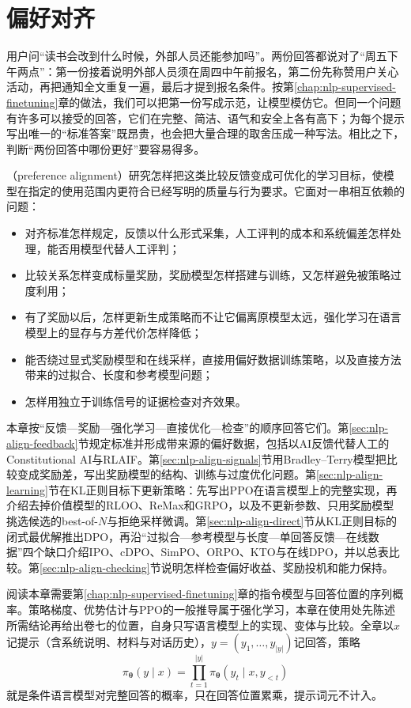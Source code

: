 \chapter{偏好对齐}
\label{chap:nlp-preference-alignment}

用户问“读书会改到什么时候，外部人员还能参加吗”。两份回答都说对了“周五下午两点”：第一份接着说明外部人员须在周四中午前报名，第二份先称赞用户关心活动，再把通知全文重复一遍，最后才提到报名条件。按第\ref{chap:nlp-supervised-finetuning}章的做法，我们可以把第一份写成示范，让模型模仿它。但同一个问题有许多可以接受的回答，它们在完整、简洁、语气和安全上各有高下；为每个提示写出唯一的“标准答案”既昂贵，也会把大量合理的取舍压成一种写法。相比之下，判断“两份回答中哪份更好”要容易得多。

（preference alignment）研究怎样把这类比较反馈变成可优化的学习目标，使模型在指定的使用范围内更符合已经写明的质量与行为要求。它面对一串相互依赖的问题：

\begin{itemize}
  \item 对齐标准怎样规定，反馈以什么形式采集，人工评判的成本和系统偏差怎样处理，能否用模型代替人工评判；
  \item 比较关系怎样变成标量奖励，奖励模型怎样搭建与训练，又怎样避免被策略过度利用；
  \item 有了奖励以后，怎样更新生成策略而不让它偏离原模型太远，强化学习在语言模型上的显存与方差代价怎样降低；
  \item 能否绕过显式奖励模型和在线采样，直接用偏好数据训练策略，以及直接方法带来的过拟合、长度和参考模型问题；
  \item 怎样用独立于训练信号的证据检查对齐效果。
\end{itemize}

本章按“反馈—奖励—强化学习—直接优化—检查”的顺序回答它们。第\ref{sec:nlp-align-feedback}节规定标准并形成带来源的偏好数据，包括以AI反馈代替人工的Constitutional AI与RLAIF。第\ref{sec:nlp-align-signals}节用Bradley--Terry模型把比较变成奖励差，写出奖励模型的结构、训练与过度优化问题。第\ref{sec:nlp-align-learning}节在KL正则目标下更新策略：先写出PPO在语言模型上的完整实现，再介绍去掉价值模型的RLOO、ReMax和GRPO，以及不更新参数、只用奖励模型挑选候选的best-of-$N$与拒绝采样微调。第\ref{sec:nlp-align-direct}节从KL正则目标的闭式最优解推出DPO，再沿“过拟合—参考模型与长度—单回答反馈—在线数据”四个缺口介绍IPO、cDPO、SimPO、ORPO、KTO与在线DPO，并以总表比较。第\ref{sec:nlp-align-checking}节说明怎样检查偏好收益、奖励投机和能力保持。

阅读本章需要第\ref{chap:nlp-supervised-finetuning}章的指令模型与回答位置的序列概率。策略梯度、优势估计与PPO的一般推导属于强化学习，本章在使用处先陈述所需结论再给出卷七的位置，自身只写语言模型上的实现、变体与比较。全章以$x$记提示（含系统说明、材料与对话历史），$y=(y_1,\ldots,y_{|y|})$记回答，策略
\[
 \pi_{\bm\theta}(y\mid x)=\prod_{t=1}^{|y|}\pi_{\bm\theta}(y_t\mid x,y_{<t})
\]
就是条件语言模型对完整回答的概率，只在回答位置累乘，提示词元不计入。

